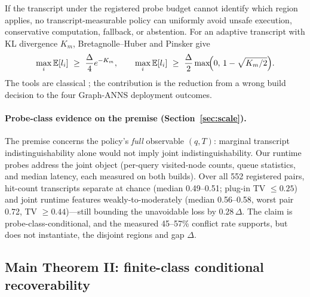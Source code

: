 \documentclass{article}
\newcommand{\E}{\mathbb{E}}
\begin{document}
If the transcript under the registered probe budget cannot identify which region applies, no
transcript-measurable policy can uniformly avoid unsafe execution, conservative computation, fallback, or
abstention. For an adaptive transcript with KL divergence $K_m$, Bretagnolle--Huber and Pinsker give
\begin{equation}
\max_{i}\E[l_{i}]\ \ge\ \frac{\Delta}{4}e^{-K_{m}},\qquad
\max_{i}\E[l_{i}]\ \ge\ \frac{\Delta}{2}\max\!\Bigl(0,\,1-\sqrt{K_{m}/2}\Bigr).
\label{eq:bh}
\end{equation}
The tools are classical \citep{yu1997assouad}; the contribution is the reduction from a wrong build
decision to the four Graph-ANNS deployment outcomes.

\paragraph{Probe-class evidence on the premise (Section~\ref{sec:scale}).}
The premise concerns the policy's \emph{full} observable $(q,T)$: marginal transcript indistinguishability
alone would not imply joint indistinguishability. Our runtime probes address the joint object (per-query
visited-node counts, queue statistics, and median latency, each measured on both builds). Over all 552
registered pairs, hit-count transcripts separate at chance (median 0.49--0.51; plug-in TV $\le0.25$) and
joint runtime features weakly-to-moderately (median 0.56--0.58, worst pair 0.72, TV $\ge0.44$)---still
bounding the unavoidable loss by $0.28\,\Delta$. The claim is probe-class-conditional, and the measured
45--57\% conflict rate supports, but does not instantiate, the disjoint regions and gap $\Delta$.

\subsection{Main Theorem II: finite-class conditional recoverability}
\end{document}
